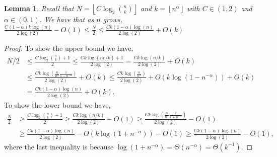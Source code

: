 \documentclass[12pt,reqno]{amsart}
\numberwithin{equation}{section}
\newtheorem{lemma}[theorem]{Lemma}
\theoremstyle{definition}
\newcommand{\floor}[1]{\left\lfloor #1 \right\rfloor}
\renewcommand{\[}{\begin{equation}}
\renewcommand{\]}{\end{equation}}
\renewcommand{\|}{\bigg{|}}
\begin{document}

\begin{lemma}\label{lem:Mbounds}
Recall that $N = \floor{C\log_2\binom{n}{k}}$ and $k = \floor{n^\alpha}$ with $C \in (1,2)$ and $\alpha \in (0,1)$. We have that as $n$ grows,
    $\frac{C(1-\alpha)k\log(n)}{2\log(2)} - O(1) \leq \frac{N}{2} \leq \frac{Ck(1-\alpha)\log(n)}{2\log(2)} + O(k)$
\end{lemma}
\begin{proof}
To show the upper bound we have,
\begin{align}
    N/2 &\leq \frac{C\log_2\binom{n}{k} + 1}{2} \leq \frac{Ck\log\left(ne/k\right) + 1}{2\log(2)} = \frac{Ck\log(n/k)}{2\log(2)} + O(k)\\
    &\leq  \frac{Ck\log\left(\frac{n}{n^\alpha}\frac{1}{1-n^{-\alpha}}\right)}{2\log(2)} + O(k) \leq \frac{Ck\log\left(\frac{n}{n^\alpha}\right)}{2\log(2)} + O(k\log(1-n^{-\alpha})) + O(k) \\
    &= \frac{Ck(1-\alpha)\log(n)}{2\log(2)} + O(k).
\end{align}
To show the lower bound we have,
\begin{align}
    \frac{N}{2} &\geq \frac{C\log_2\binom{n}{k} - 1}{2} \geq \frac{Ck\log(n/k)}{2\log(2)} - O(1) \geq \frac{Ck\log\left(\frac{n}{n^\alpha}\frac{1}{1+n^{-\alpha}} \right)}{2\log(2)} - O(1)\\
    &\geq \frac{Ck(1-\alpha)\log(n)}{2\log(2)} - O(k \log(1 + n^{-\alpha})) - O(1) \geq \frac{Ck(1-\alpha)\log(n)}{2\log(2)} - O(1),
\end{align}
where the last inequality is because $\log(1+n^{-\alpha}) = \Theta(n^{-\alpha}) = \Theta(k^{-1})$.
\end{proof}
\end{document}
